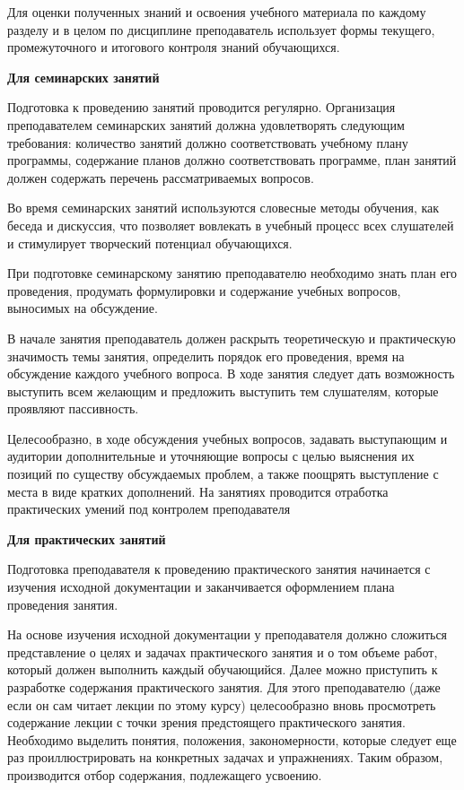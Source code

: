 \documentclass[a4paper, 12pt]{article}
\begin{document}
Для оценки полученных знаний и освоения учебного материала по каждому разделу и в целом по дисциплине преподаватель использует формы текущего, промежуточного и итогового контроля знаний обучающихся.

\vspace{8pt}
{\bf Для семинарских занятий}

Подготовка к проведению занятий проводится регулярно. Организация преподавателем семинарских занятий должна удовлетворять следующим требования: количество занятий должно соответствовать учебному плану программы, содержание планов должно соответствовать программе, план занятий должен содержать перечень рассматриваемых вопросов.

Во время семинарских занятий используются словесные методы обучения, как беседа и дискуссия, что позволяет вовлекать в учебный процесс всех слушателей и стимулирует творческий потенциал обучающихся. 

При подготовке семинарскому занятию преподавателю необходимо знать план его проведения, продумать формулировки и содержание учебных вопросов, выносимых на обсуждение. 

В начале занятия преподаватель должен раскрыть теоретическую и практическую значимость темы занятия, определить порядок его проведения, время на обсуждение каждого учебного вопроса. В ходе занятия следует дать возможность выступить всем желающим и предложить выступить тем слушателям, которые проявляют пассивность.

Целесообразно, в ходе обсуждения учебных вопросов, задавать выступающим и аудитории дополнительные и уточняющие вопросы с целью выяснения их позиций по существу обсуждаемых проблем, а также поощрять выступление с места в виде кратких дополнений. На занятиях проводится отработка практических умений под контролем преподавателя

\vspace{8pt}
{\bf Для практических занятий}

Подготовка преподавателя к проведению практического занятия начинается с изучения исходной документации и заканчивается оформлением плана проведения занятия.

На основе изучения исходной документации у преподавателя должно сложиться представление о целях и задачах практического занятия и о том объеме работ, который должен выполнить каждый обучающийся. Далее можно приступить к разработке содержания практического занятия. Для этого преподавателю (даже если он сам читает лекции по этому курсу) целесообразно вновь просмотреть содержание лекции с точки зрения предстоящего практического занятия. Необходимо выделить понятия, положения, закономерности, которые следует еще раз проиллюстрировать на конкретных задачах и упражнениях. Таким образом, производится отбор содержания, подлежащего усвоению.
\end{document}
